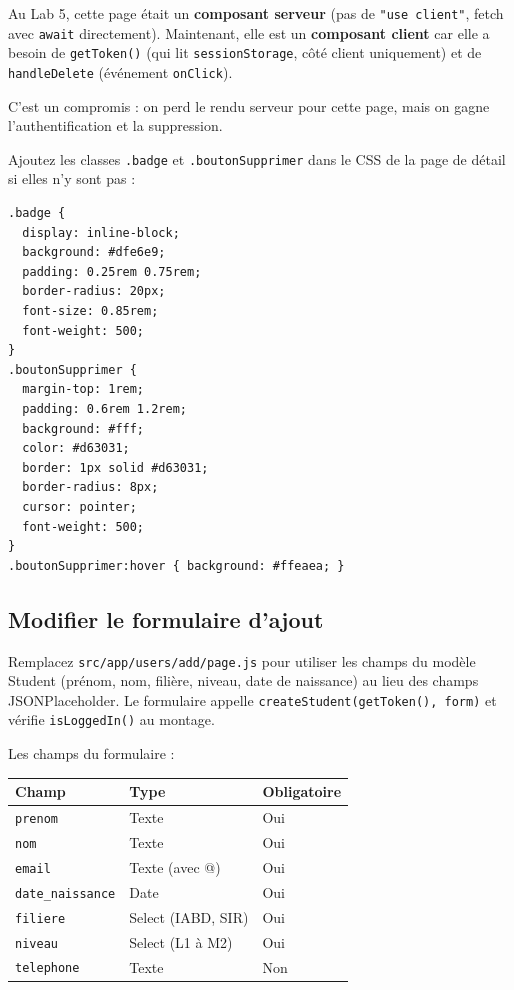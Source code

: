 \documentclass[11pt,a4paper]{article}
\begin{document}
\begin{attentionbox}
Au Lab 5, cette page était un \textbf{composant serveur} (pas de \texttt{"use client"}, fetch avec \texttt{await} directement). Maintenant, elle est un \textbf{composant client} car elle a besoin de \texttt{getToken()} (qui lit \texttt{sessionStorage}, côté client uniquement) et de \texttt{handleDelete} (événement \texttt{onClick}).

C'est un compromis : on perd le rendu serveur pour cette page, mais on gagne l'authentification et la suppression.
\end{attentionbox}

Ajoutez les classes \texttt{.badge} et \texttt{.boutonSupprimer} dans le CSS de la page de détail si elles n'y sont pas :

\begin{lstlisting}[style=terminal]
.badge {
  display: inline-block;
  background: #dfe6e9;
  padding: 0.25rem 0.75rem;
  border-radius: 20px;
  font-size: 0.85rem;
  font-weight: 500;
}
.boutonSupprimer {
  margin-top: 1rem;
  padding: 0.6rem 1.2rem;
  background: #fff;
  color: #d63031;
  border: 1px solid #d63031;
  border-radius: 8px;
  cursor: pointer;
  font-weight: 500;
}
.boutonSupprimer:hover { background: #ffeaea; }
\end{lstlisting}

\subsection{Modifier le formulaire d'ajout}

Remplacez \texttt{src/app/users/add/page.js} pour utiliser les champs du modèle Student (prénom, nom, filière, niveau, date de naissance) au lieu des champs JSONPlaceholder. Le formulaire appelle \texttt{createStudent(getToken(), form)} et vérifie \texttt{isLoggedIn()} au montage.

Les champs du formulaire :

\begin{center}
\begin{tabular}{lll}
\toprule
\textbf{Champ} & \textbf{Type} & \textbf{Obligatoire} \\
\midrule
\texttt{prenom} & Texte & Oui \\
\texttt{nom} & Texte & Oui \\
\texttt{email} & Texte (avec @) & Oui \\
\texttt{date\_naissance} & Date & Oui \\
\texttt{filiere} & Select (IABD, SIR) & Oui \\
\texttt{niveau} & Select (L1 à M2) & Oui \\
\texttt{telephone} & Texte & Non \\
\bottomrule
\end{tabular}
\end{center}
\end{document}
